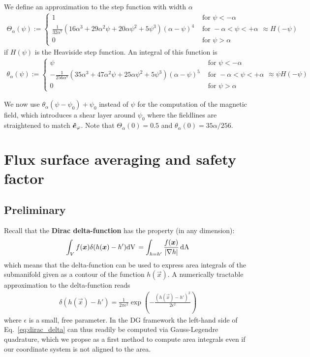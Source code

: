 We define an approximation to the step function with width $\alpha$
\begin{align}
\Theta_\alpha(\psi) := \begin{cases}
    1 & \text{ for } \psi < - \alpha  \\
    \frac{1}{32 \alpha^7}  \left(16 \alpha^3+29 \alpha^2 \psi+20 \alpha \psi^2+5 \psi^3\right) (\alpha-\psi)^4
    &\text{ for } -\alpha<\psi<+\alpha \\
    0 & \text{ for } \psi > \alpha 
\end{cases}
    \approx H(-\psi)
\label{eq:approx_heaviside}
\end{align}
if $H(\psi)$ is the Heaviside step function.
An integral of this function is
\begin{align}
\theta_\alpha(\psi) := \begin{cases}
\psi &\text{ for } \psi < -\alpha \\
    - \frac{1}{256 \alpha^7} \left(35 \alpha^3+47 \alpha^2 \psi+25 \alpha \psi^2+5 \psi^3\right) (\alpha-\psi)^5
     &\text{ for } -\alpha<\psi<+\alpha \\
    0 &\text{ for } \psi > \alpha
\end{cases}
    \approx \psi H(-\psi)
\label{eq:modified_psi}
\end{align}

We now use $\theta_\alpha(\psi-\psi_0)+\psi_0$ instead of $\psi$ for the computation of the
magnetic field, which introduces a shear layer around $\psi_0$ where the
fieldlines are straightened to match $\bm{\hat{e}}_\varphi$.
Note that $\Theta_\alpha(0) = 0.5$ and $\theta_\alpha(0) = 35\alpha/256$.
\section{Flux surface averaging and safety factor}
\subsection{Preliminary}
Recall that the {\bf Dirac delta-function} has the property (in any dimension):
\begin{align} \label{eq:dirac_delta}
\int_V f({\boldsymbol{x}}) \delta(h({\boldsymbol{x}}) - h') \mathrm{dV}\, = \int_{h=h'} \frac{f({\boldsymbol{x}})}{|\nabla h|} \,\mathrm{dA}
\end{align}
which means that the delta-function can be used to express area integrals of the
submanifold given as a contour of the function $h(\vec x)$.
A numerically tractable approximation to the delta-function reads
\begin{align}\label{eq:delta}
\delta(h(\vec x)-h') = \frac{1}{2\pi \epsilon^2}
\exp\left( - \frac{\left(h(\vec x)-h'\right)^2}{2\epsilon^2}\right)
\end{align}
where $\epsilon$ is a small, free parameter.
In the DG framework the left-hand side
of Eq.~\eqref{eq:dirac_delta} can thus readily be computed
via Gauss-Legendre quadrature, which we propse as a first method to compute area
integrals even if our coordinate system is not aligned to the area.

